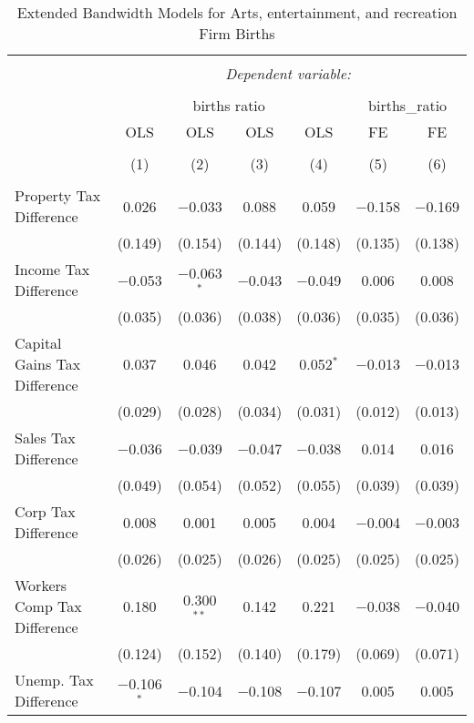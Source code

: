 
\begin{table}[!htbp] \centering 
  \caption{Extended Bandwidth Models for  Arts, entertainment, and recreation Firm Births} 
  \label{71eb} 
\begin{tabular}{@{\extracolsep{5pt}}lcccccc} 
\\[-1.8ex]\hline 
\hline \\[-1.8ex] 
 & \multicolumn{6}{c}{\textit{Dependent variable:}} \\ 
\cline{2-7} 
\\[-1.8ex] & \multicolumn{4}{c}{births ratio} & \multicolumn{2}{c}{births\_ratio} \\ 
 & OLS & OLS & OLS & OLS & FE & FE \\ 
\\[-1.8ex] & (1) & (2) & (3) & (4) & (5) & (6)\\ 
\hline \\[-1.8ex] 
 Property Tax Difference & 0.026 & $-$0.033 & 0.088 & 0.059 & $-$0.158 & $-$0.169 \\ 
  & (0.149) & (0.154) & (0.144) & (0.148) & (0.135) & (0.138) \\ 
  Income Tax Difference & $-$0.053 & $-$0.063$^{*}$ & $-$0.043 & $-$0.049 & 0.006 & 0.008 \\ 
  & (0.035) & (0.036) & (0.038) & (0.036) & (0.035) & (0.036) \\ 
  Capital Gains Tax Difference & 0.037 & 0.046 & 0.042 & 0.052$^{*}$ & $-$0.013 & $-$0.013 \\ 
  & (0.029) & (0.028) & (0.034) & (0.031) & (0.012) & (0.013) \\ 
  Sales Tax Difference & $-$0.036 & $-$0.039 & $-$0.047 & $-$0.038 & 0.014 & 0.016 \\ 
  & (0.049) & (0.054) & (0.052) & (0.055) & (0.039) & (0.039) \\ 
  Corp Tax Difference & 0.008 & 0.001 & 0.005 & 0.004 & $-$0.004 & $-$0.003 \\ 
  & (0.026) & (0.025) & (0.026) & (0.025) & (0.025) & (0.025) \\ 
  Workers Comp Tax Difference & 0.180 & 0.300$^{**}$ & 0.142 & 0.221 & $-$0.038 & $-$0.040 \\ 
  & (0.124) & (0.152) & (0.140) & (0.179) & (0.069) & (0.071) \\ 
  Unemp. Tax Difference & $-$0.106$^{*}$ & $-$0.104 & $-$0.108 & $-$0.107 & 0.005 & 0.005 \\ 

\end{tabular}
\end{table}
